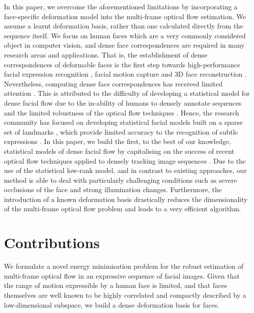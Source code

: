 In this paper, we overcome the aforementioned limitations by incorporating a face-specific 
deformation model into the multi-frame optical flow estimation. We assume a learnt 
deformation basis, rather than one calculated directly from the sequence itself. We 
focus on human faces which are a very commonly considered object in computer vision, 
and dense face correspondences are required in many research areas and applications. 
That is, the establishment of dense correspondences of deformable faces is the first step 
towards high-performance facial expression recognition \cite{koelstra2010dynamic}, facial 
motion capture \cite{beeler2011high} and 3D face reconstruction \cite{Garg:2013gr}. 
Nevertheless, computing dense face correspondences has received limited attention 
\cite{decarlo2000optical,yacoob1996recognizing}. This is attributed to the difficulty of 
developing a statistical model for dense facial flow due to the in-ability of humans to 
densely annotate sequences and the limited robustness of the optical flow techniques 
\cite{decarlo2000optical}. Hence, the research community has focused on developing 
statistical facial models built on a sparse set of landmarks \cite{xiong2013supervised}, 
which provide limited accuracy to the recognition of subtle expressions \cite{li2013spontaneous}. 
In this paper, we build the first, to the best of our knowledge, statistical models of 
dense facial flow by capitalising on the success of recent optical flow techniques applied to 
densely tracking image sequences \cite{Garg:2013hu}. Due to the use of the statistical 
low-rank model, and in contrast to existing approaches, our method is able to deal with 
particularly challenging conditions such as severe occlusions of the face and strong 
illumination changes. Furthermore, the introduction of a known deformation basis drastically 
reduces the dimensionality of the multi-frame optical flow problem and leads to a 
very efficient algorithm.
\section{Contributions}\label{sec:contributions}
We formulate a novel energy minimisation problem for the robust estimation of 
multi-frame optical flow in an expressive sequence of facial images.
Given that the range of motion expressible by a human face is limited, and that
faces themselves are well known to be highly correlated and compactly described 
by a low-dimensional subspace, we build a dense deformation 
basis for faces.

